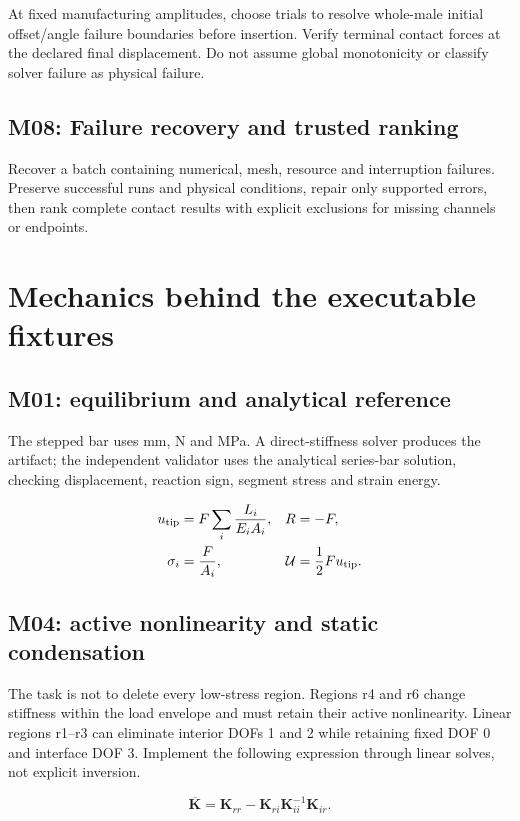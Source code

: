 \documentclass[UTF8,a4paper,11pt,fontset=windows]{ctexart}
\begin{document}
At fixed manufacturing amplitudes, choose trials to resolve whole-male initial offset/angle failure boundaries before insertion. Verify terminal contact forces at the declared final displacement. Do not assume global monotonicity or classify solver failure as physical failure.

\subsection{M08: Failure recovery and trusted ranking}

Recover a batch containing numerical, mesh, resource and interruption failures. Preserve successful runs and physical conditions, repair only supported errors, then rank complete contact results with explicit exclusions for missing channels or endpoints.

\section{Mechanics behind the executable fixtures}

\subsection{M01: equilibrium and analytical reference}

The stepped bar uses mm, N and MPa. A direct-stiffness solver produces the artifact; the independent validator uses the analytical series-bar solution, checking displacement, reaction sign, segment stress and strain energy.

\begin{align} u_{\rm tip}&=F\sum_i\frac{L_i}{E_i A_i}, & R&=-F,\\ \sigma_i&=\frac{F}{A_i}, & \mathcal{U}&=\frac12 F u_{\rm tip}.\end{align}

\subsection{M04: active nonlinearity and static condensation}

The task is not to delete every low-stress region. Regions r4 and r6 change stiffness within the load envelope and must retain their active nonlinearity. Linear regions r1--r3 can eliminate interior DOFs 1 and 2 while retaining fixed DOF 0 and interface DOF 3. Implement the following expression through linear solves, not explicit inversion.

\begin{equation}\overline{\mathbf{K}}=\mathbf{K}_{rr}-\mathbf{K}_{ri}\mathbf{K}_{ii}^{-1}\mathbf{K}_{ir}.\end{equation}
\end{document}
